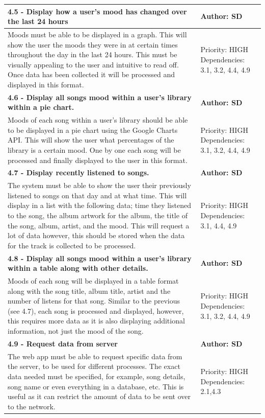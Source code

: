 \documentclass[11pt]{report}
\begin{document}
\begin{center}
\begin{longtable}{| p{13cm} | p{3cm} |}
\hline
\textbf{4.5 - Display how a user’s mood has changed over the last 24 hours} & \textbf{Author: SD} \\
\hline
Moods must be able to be displayed in a graph. This will show the user the  moods they were in at certain times throughout the day in the last 24 hours. This must be visually appealing to the user and intuitive to read off. Once data has been collected it will be processed and displayed in this format. & Priority: HIGH Dependencies: 3.1, 3.2, 4.4, 4.9\\
\hline
\textbf{4.6 - Display all songs mood within a user’s library within a pie chart.} & \textbf{Author: SD} \\
\hline
Moods of each song within a user’s library should be able to be displayed in a pie chart using the Google Charts API. This will show the user what percentages of the library is a certain mood. One by one each song will be processed and finally displayed to the user in this format.&  Priority: HIGH Dependencies: 3.1, 3.2, 4.4, 4.9\\
\hline
\textbf{4.7 - Display recently listened to songs.} & \textbf{Author: SD} \\
\hline
The system must be able to show the user their previously listened to songs on that day and at what time. This will display in a list with the following data; time they listened to the song, the album artwork for the album, the title of the song, album, artist, and the mood. This will request a lot of data however, this should be stored when the data for the track is collected to be processed.& Priority: HIGH Dependencies: 3.1, 4.4, 4.9\\
\hline
\textbf{4.8 - Display all songs mood within a user’s library within a table along with other details.} & \textbf{Author: SD} \\
\hline
Moods of each song will be displayed in a table format along with the song title, album title, artist and the number of listens for that song. Similar to the previous (see 4.7), each song is processed and displayed, however, this requires more data as it is also displaying additional information, not just the mood of the song.&  Priority: HIGH Dependencies: 3.1, 3.2, 4.4, 4.9\\
\hline
\textbf{4.9 -  Request data from server} & \textbf{Author: SD} \\
\hline
The web app must be able to request specific data from the server, to be used for different processes. The exact data needed must be specified, for example, song details, song name or even everything in a database, etc. This is useful as it can restrict the amount of data to be sent over to the network.& Priority: HIGH Dependencies: 2.1,4.3\\
\hline

\end{longtable}

\end{center}
\end{document}

